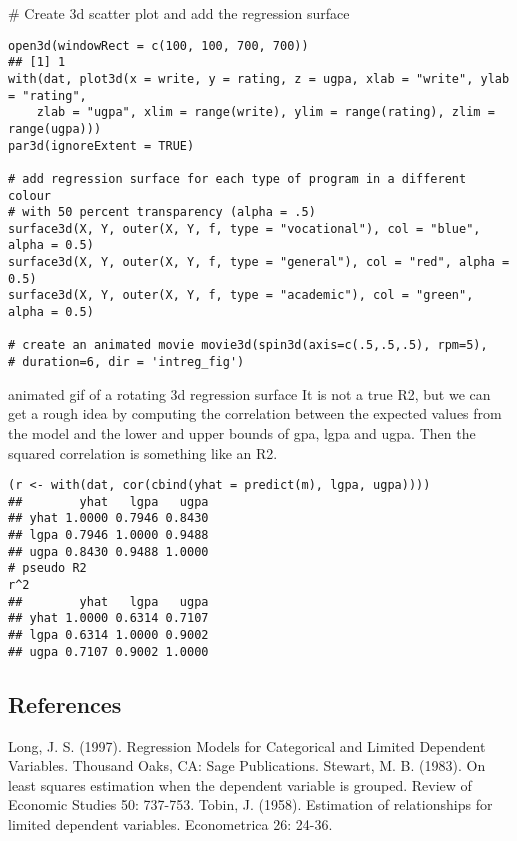 # Create 3d scatter plot and add the regression surface
\begin{framed}
\begin{verbatim}
open3d(windowRect = c(100, 100, 700, 700))
## [1] 1
with(dat, plot3d(x = write, y = rating, z = ugpa, xlab = "write", ylab = "rating", 
    zlab = "ugpa", xlim = range(write), ylim = range(rating), zlim = range(ugpa)))
par3d(ignoreExtent = TRUE)

# add regression surface for each type of program in a different colour
# with 50 percent transparency (alpha = .5)
surface3d(X, Y, outer(X, Y, f, type = "vocational"), col = "blue", alpha = 0.5)
surface3d(X, Y, outer(X, Y, f, type = "general"), col = "red", alpha = 0.5)
surface3d(X, Y, outer(X, Y, f, type = "academic"), col = "green", alpha = 0.5)

# create an animated movie movie3d(spin3d(axis=c(.5,.5,.5), rpm=5),
# duration=6, dir = 'intreg_fig')
\end{verbatim}
\end{framed}

animated gif of a rotating 3d regression surface
It is not a true R2, but we can get a rough idea by computing the correlation between the expected values from the model and the lower and upper bounds of gpa, lgpa and ugpa. Then the squared correlation is something like an R2.
\begin{framed}
\begin{verbatim}
(r <- with(dat, cor(cbind(yhat = predict(m), lgpa, ugpa))))
##        yhat   lgpa   ugpa
## yhat 1.0000 0.7946 0.8430
## lgpa 0.7946 1.0000 0.9488
## ugpa 0.8430 0.9488 1.0000
# pseudo R2
r^2
##        yhat   lgpa   ugpa
## yhat 1.0000 0.6314 0.7107
## lgpa 0.6314 1.0000 0.9002
## ugpa 0.7107 0.9002 1.0000

\end{verbatim}
\end{framed}
\subsection{References}
Long, J. S. (1997). Regression Models for Categorical and Limited Dependent Variables. Thousand Oaks, CA: Sage Publications.
Stewart, M. B. (1983). On least squares estimation when the dependent variable is grouped. Review of Economic Studies 50: 737-753.
Tobin, J. (1958). Estimation of relationships for limited dependent variables. Econometrica 26: 24-36.
